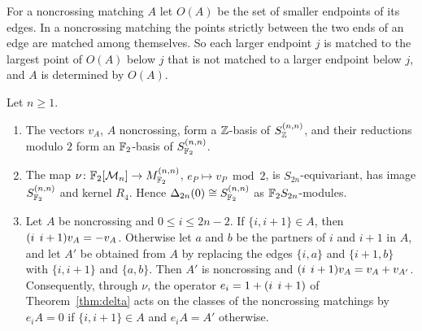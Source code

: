 For a noncrossing matching $A$ let $O(A)$ be the set of smaller endpoints of its edges. In a noncrossing matching the points strictly between the two ends of an edge are matched among themselves. So each larger endpoint $j$ is matched to the largest point of $O(A)$ below $j$ that is not matched to a larger endpoint below $j$, and $A$ is determined by $O(A)$.

\begin{theorem}\label{thm:step1}
Let $n\ge1$.
\begin{enumerate}
\item The vectors $v_A$, $A$ noncrossing, form a $\mathbb{Z}$-basis of $S^{(n,n)}_{\mathbb{Z}}$, and their reductions modulo $2$ form an $\mathbb{F}_2$-basis of $S^{(n,n)}_{\mathbb{F}_2}$.
\item The map $\nu\colon\mathbb{F}_2[\mathcal{M}_n]\to M^{(n,n)}_{\mathbb{F}_2}$, $e_P\mapsto v_P\bmod2$, is $S_{2n}$-equivariant, has image $S^{(n,n)}_{\mathbb{F}_2}$ and kernel $R_4$. Hence $\Delta_{2n}(0)\cong S^{(n,n)}_{\mathbb{F}_2}$ as $\mathbb{F}_2 S_{2n}$-modules.
\item Let $A$ be noncrossing and $0\le i\le2n-2$. If $\{i,i+1\}\in A$, then $(i\;\,i+1)v_A=-v_A$. Otherwise let $a$ and $b$ be the partners of $i$ and $i+1$ in $A$, and let $A'$ be obtained from $A$ by replacing the edges $\{i,a\}$ and $\{i+1,b\}$ with $\{i,i+1\}$ and $\{a,b\}$. Then $A'$ is noncrossing and $(i\;\,i+1)v_A=v_A+v_{A'}$. Consequently, through $\nu$, the operator $e_i=1+(i\;\,i+1)$ of Theorem~\ref{thm:delta} acts on the classes of the noncrossing matchings by $e_{i}A=0$ if $\{i,i+1\}\in A$ and $e_{i}A=A'$ otherwise.
\end{enumerate}
\end{theorem}

